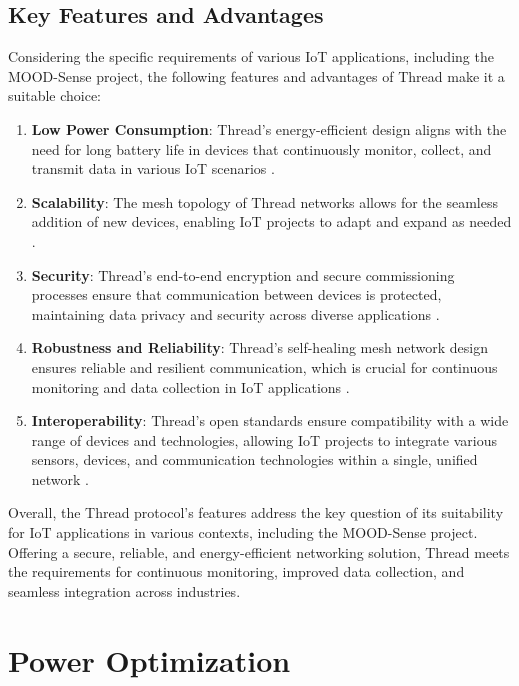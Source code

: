 \subsection{Key Features and Advantages}

Considering the specific requirements of various \gls{IoT} applications, including the MOOD-Sense project, the following features and advantages of Thread make it a suitable choice:

\begin{enumerate}
    \item \textbf{Low Power Consumption}: Thread's energy-efficient design aligns with the need for long battery life in devices that continuously monitor, collect, and transmit data in various \gls{IoT} scenarios \cite{Thread_Group_Fundamentals}.
    \item \textbf{Scalability}: The mesh topology of Thread networks allows for the seamless addition of new devices, enabling \gls{IoT} projects to adapt and expand as needed \cite{Thread_Group_Fundamentals}.
    \item \textbf{Security}: Thread's end-to-end encryption and secure commissioning processes ensure that communication between devices is protected, maintaining data privacy and security across diverse applications \cite{Thread_Group_Fundamentals}.
    \item \textbf{Robustness and Reliability}: Thread's self-healing mesh network design ensures reliable and resilient communication, which is crucial for continuous monitoring and data collection in \gls{IoT} applications \cite{Thread_Group_Fundamentals}.
    \item \textbf{Interoperability}: Thread's open standards ensure compatibility with a wide range of devices and technologies, allowing \gls{IoT} projects to integrate various sensors, devices, and communication technologies within a single, unified network \cite{Thread_Group_Fundamentals}.
\end{enumerate}

Overall, the Thread protocol's features address the key question of its suitability for \gls{IoT} applications in various contexts, including the MOOD-Sense project. Offering a secure, reliable, and energy-efficient networking solution, Thread meets the requirements for continuous monitoring, improved data collection, and seamless integration across industries.


\section{Power Optimization}\label{sec:power_optimization}

